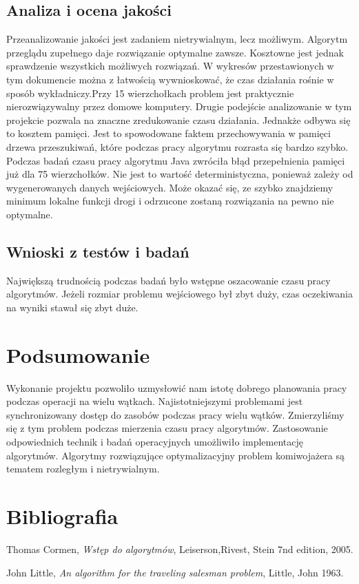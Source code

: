 \documentclass{article}
\begin{document}
	
	\subsection{Analiza i ocena jakości}
		Przeanalizowanie jakości jest zadaniem nietrywialnym, lecz możliwym. Algorytm przeglądu zupełnego daje rozwiązanie optymalne zawsze. Kosztowne jest jednak sprawdzenie wszystkich możliwych rozwiązań. W wykresów przestawionych w tym dokumencie można z łatwością wywnioskować, że czas działania rośnie w sposób wykładniczy.Przy 15 wierzchołkach problem jest praktycznie nierozwiązywalny przez domowe komputery. Drugie podejście analizowanie w tym projekcie pozwala na znaczne zredukowanie czasu działania. Jednakże odbywa się to kosztem pamięci. Jest to spowodowane faktem przechowywania w pamięci drzewa przeszukiwań, które podczas pracy algorytmu rozrasta się bardzo szybko. Podczas badań czasu pracy algorytmu Java zwróciła błąd przepełnienia pamięci już dla 75 wierzchołków. Nie jest to wartość deterministyczna, ponieważ zależy od wygenerowanych danych wejściowych. Może okazać się, ze szybko znajdziemy minimum lokalne funkcji drogi i odrzucone zostaną rozwiązania na pewno nie optymalne.
	\subsection{Wnioski z testów i badań}
		Największą trudnością podczas badań było wstępne oszacowanie czasu pracy algorytmów. Jeżeli rozmiar problemu wejściowego był zbyt duży, czas oczekiwania na wyniki stawał się zbyt duże.
		
\section{Podsumowanie}
	Wykonanie projektu pozwoliło uzmysłowić nam istotę dobrego planowania pracy podczas operacji na wielu wątkach. Najistotniejszymi problemami jest synchronizowany dostęp do zasobów podczas pracy wielu wątków. Zmierzyliśmy się z tym problem podczas mierzenia czasu pracy algorytmów. Zastosowanie odpowiednich technik i badań operacyjnych umożliwiło implementację algorytmów. Algorytmy rozwiązujące optymalizacyjny problem komiwojażera są tematem rozległym i nietrywialnym.
\section{Bibliografia}
\printbibliography[heading=none]
\begin{thebibliography}{9}
	
	Thomas Cormen,
	\emph{Wstęp do algorytmów},
	Leiserson,Rivest, Stein
	7nd edition,
	2005.
	
	John Little, 
	\emph{An algorithm for the traveling salesman problem},
	Little, John
	1963.
	
\end{thebibliography}
\end{document}
